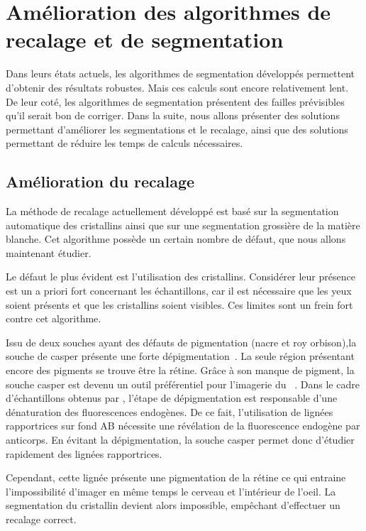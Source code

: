 \documentclass[\main/main.tex]{subfiles}
\begin{document}
                    
\section{Amélioration des algorithmes de recalage et de segmentation}

%
Dans leurs états actuels, les algorithmes de segmentation développés permettent d'obtenir des résultats robustes.
%
Mais ces calculs sont encore relativement lent.
%
De leur coté,
les algorithmes de segmentation présentent des failles prévisibles qu'il serait bon
de corriger.
%
Dans la suite,
nous allons présenter des solutions permettant d'améliorer les segmentations et le recalage,
ainsi que des solutions permettant de réduire les temps de calculs nécessaires.

    \subsection{Amélioration du recalage}
 
%   
La méthode de recalage actuellement développé est basé sur la segmentation automatique des cristallins ainsi que sur une segmentation grossière de la matière blanche.
%
Cet algorithme possède un certain nombre de défaut, que nous allons maintenant étudier.

%
Le défaut le plus évident est l'utilisation des cristallins.
%
Considérer leur présence est un a priori fort concernant les échantillons, car il est nécessaire que les yeux soient présents et que les cristallins soient visibles.
%
Ces limites sont un frein fort contre cet algorithme.

%
Issu de deux souches ayant des défauts de pigmentation (nacre et roy orbison),la souche de \pz{} casper présente une forte dépigmentation~\cite{white_2008}.
%
La seule région présentant encore des pigments se trouve être la rétine.
%
Grâce à son manque de pigment, la souche casper est devenu un outil préférentiel pour l'imagerie du \pz~\cite{hecker_2020,camiolo_2020, wertman_2020}.
%
Dans le cadre d'échantillons obtenus par \ihcie{}, l'étape de dépigmentation est responsable d'une dénaturation des fluorescences endogènes.
%
De ce fait, l'utilisation de lignées rapportrices sur fond AB nécessite une révélation de la fluorescence endogène par anticorps.
%
En évitant la dépigmentation, la souche casper permet donc d'étudier rapidement des lignées rapportrices.

Cependant, cette lignée présente une pigmentation de la rétine
ce qui entraine l'impossibilité d'imager en même temps le cerveau et l'intérieur de l'oeil.
%
La segmentation du cristallin devient alors impossible, empêchant d'effectuer un recalage correct.
\end{document}
